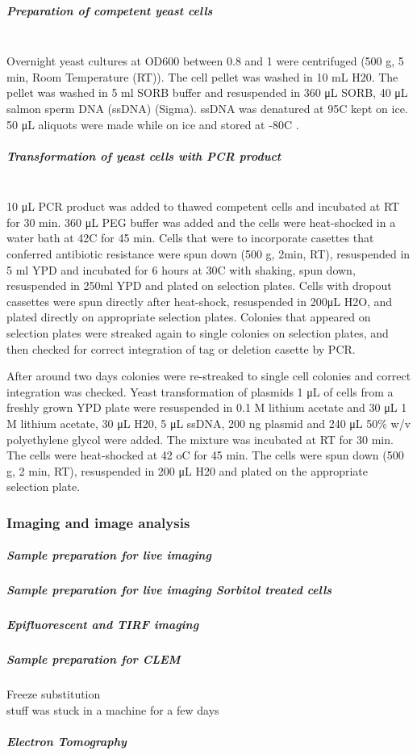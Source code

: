 \subparagraph{Preparation of competent yeast cells} 
\mbox{}\\
Overnight yeast cultures at OD600 between 0.8 and 1 were centrifuged (500 g, 5 min, Room Temperature (RT)). The cell
pellet was washed in 10 mL H20. The pellet was washed in 5 ml SORB buffer and resuspended in 360 μL SORB, 40 μL salmon sperm DNA (ssDNA) (Sigma). ssDNA was denatured at 95C kept on ice. 50 μL aliquots were made while on ice and stored at -80C .

\subparagraph{Transformation of yeast cells with PCR product} 
\mbox{}\\
10 μL PCR product was added to thawed competent cells and incubated at RT for 30 min. 360 μL PEG buffer was added and the cells were heat-shocked in a water bath at 42C for 45 min. Cells that were to incorporate casettes that conferred antibiotic resistance were spun down (500 g, 2min, RT), resuspended in 5 ml YPD and incubated for 6 hours at 30C with shaking, spun down, resuspended in 250ml YPD and plated on selection plates. Cells with dropout cassettes were spun directly after heat-shock, resuspended in 200μL H2O, and plated directly on appropriate selection plates. Colonies that appeared on selection plates were streaked again to single colonies on selection plates, and then checked for correct integration of tag or deletion casette by PCR.

After around two days colonies were re-streaked to single cell colonies and correct integration was checked.
Yeast transformation of plasmids
1 μL of cells from a freshly grown YPD plate were resuspended in 0.1 M lithium acetate and 30 μL 1 M lithium acetate, 30 μL H20, 5 μL ssDNA, 200 ng plasmid and 240 μL 50\% w/v polyethylene glycol were added. The mixture was incubated at RT for 30 min. The cells were heat-shocked at 42 oC for 45 min. The cells were spun down (500 g, 2 min, RT), resuspended in 200 μL H20 and plated on the appropriate selection plate.

\subsubsection{Imaging and image analysis }

\subparagraph{Sample preparation for live imaging}

\subparagraph{Sample preparation for live imaging Sorbitol treated cells}

\subparagraph{Epifluorescent and TIRF imaging}

\subparagraph{Sample preparation for CLEM}
\vspace{1mm}
\subsubitem
Freeze substitution
			\mbox{}\\
			stuff was stuck in a machine for a few days

\subparagraph{Electron Tomography}


